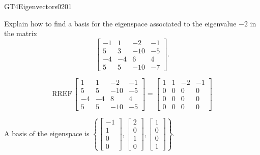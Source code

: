 \begin{exercise}{GT4}{Eigenvectors}{0201} 
\begin{exerciseStatement} 

Explain how to find a basis for the eigenspace associated to the eigenvalue \(-2\) in the matrix \[\left[\begin{array}{cccc}
-1 & 1 & -2 & -1 \\
5 & 3 & -10 & -5 \\
-4 & -4 & 6 & 4 \\
5 & 5 & -10 & -7
\end{array}\right].\]

 \end{exerciseStatement}
 \begin{exerciseAnswer} 

\[\mathrm{RREF}\,\left[\begin{array}{cccc}
1 & 1 & -2 & -1 \\
5 & 5 & -10 & -5 \\
-4 & -4 & 8 & 4 \\
5 & 5 & -10 & -5
\end{array}\right]=\left[\begin{array}{cccc}
1 & 1 & -2 & -1 \\
0 & 0 & 0 & 0 \\
0 & 0 & 0 & 0 \\
0 & 0 & 0 & 0
\end{array}\right]\]

 

A basis of the eigenspace is \(\left\{ \left[\begin{array}{c}
-1 \\
1 \\
0 \\
0
\end{array}\right] , \left[\begin{array}{c}
2 \\
0 \\
1 \\
0
\end{array}\right] , \left[\begin{array}{c}
1 \\
0 \\
0 \\
1
\end{array}\right] \right\}\).

 \end{exerciseAnswer}
 \end{exercise}


\newpage




